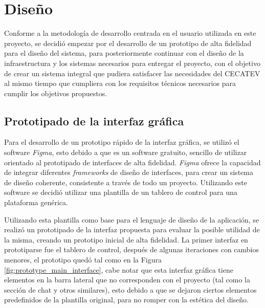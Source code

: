 \section{Diseño}

Conforme a la metodología de desarrollo centrada en el usuario utilizada en este proyecto, se decidió empezar por el desarrollo de un prototipo de alta fidelidad para el diseño del sistema, para posteriormente continuar con el diseño de la infraestructura y los sistemas necesarios para entregar el proyecto, con el objetivo de crear un sistema integral que pudiera satisfacer las necesidades del CECATEV al mismo tiempo que cumpliera con los requisitos técnicos necesarios para cumplir los objetivos propuestos.

\subsection{Prototipado de la interfaz gráfica}

Para el desarrollo de un prototipo rápido de la interfaz gráfica, se utilizó el software \textit{Figma}, esto debido a que es un software gratuito, sencillo de utilizar orientado al prototipado de interfaces de alta fidelidad. \textit{Figma} ofrece la capacidad de integrar diferentes \textit{frameworks} de diseño de interfaces, para crear un sistema de diseño coherente, consistente a través de todo un proyecto. Utilizando este software se decidió utilizar una plantilla de un tablero de control para una plataforma genérica.

Utilizando esta plantilla como base para el lenguaje de diseño de la aplicación, se realizó un prototipado de la interfaz propuesta para evaluar la posible utilidad de la misma, creando un prototipo inicial de alta fidelidad. La primer interfaz en prototiparse fue el tablero de control, después de algunas iteraciones con cambios menores, el prototipo quedó tal como en la Figura \ref{fig:prototype_main_interface}, cabe notar que esta interfaz gráfica tiene elementos en la barra lateral que no corresponden con el proyecto (tal como la sección de chat y otros similares), esto debido a que se dejaron ciertos elementos predefinidos de la plantilla original, para no romper con la estética del diseño.

